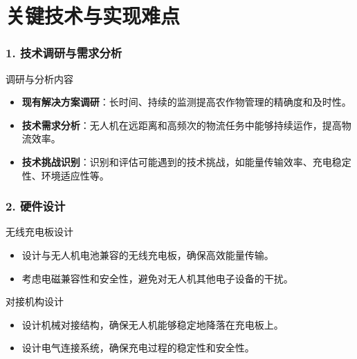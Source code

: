 

\section{关键技术与实现难点}

\begin{frame}
  \frametitle{1. 技术调研与需求分析}
  
  \begin{block}{调研与分析内容}
    \begin{itemize}
      \item \textbf{现有解决方案调研}：长时间、持续的监测提高农作物管理的精确度和及时性。
      \item \textbf{技术需求分析}：无人机在远距离和高频次的物流任务中能够持续运作，提高物流效率。
      \item \textbf{技术挑战识别}：识别和评估可能遇到的技术挑战，如能量传输效率、充电稳定性、环境适应性等。
  \end{itemize}
  \end{block}
  \end{frame}
  
  \begin{frame}
  \frametitle{2. 硬件设计}
  
  \begin{block}{无线充电板设计}
      \begin{itemize}
          \item 设计与无人机电池兼容的无线充电板，确保高效能量传输。
          \item 考虑电磁兼容性和安全性，避免对无人机其他电子设备的干扰。
      \end{itemize}
  \end{block}
  
  \begin{block}{对接机构设计}
      \begin{itemize}
          \item 设计机械对接结构，确保无人机能够稳定地降落在充电板上。
          \item 设计电气连接系统，确保充电过程的稳定性和安全性。
      \end{itemize}
  \end{block}
  
  \end{frame}
  
